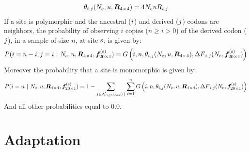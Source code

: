 \begin{equation}
\theta_{{i}, {j}}(N_{\textrm{e}}, u, \bm{R}_{4\times4}) = 4 N_{\textrm{e}} u R_{{i}, {j}}
\end{equation}
If a site is polymorphic and the ancestral (${i}$) and derived (${j}$) codons are neighbors, the probability of observing $i$ copies ($n \geq i > 0$) of the derived codon (${j}$), in a sample of size $n$, at site $\text{s}$, is given by:
\begin{equation}
P({i}=n-i,{j}=i \ |\ N_{\textrm{e}}, u, \bm{R}_{4\times4}, \bm{f}_{20\times1}^{(\text{s})}) = G\left(i, n, \theta_{{i}, {j}}(N_{\textrm{e}}, u, \bm{R}_{4\times4}), {\Delta F}_{{i}, {j}}(N_{\textrm{e}}, \bm{f}_{20\times1}^{(\text{s})}) \right)
\end{equation}
Moreover the probability that a site is monomorphic is given by:
\begin{equation}
P({i}= n \ |\ N_{\textrm{e}}, u, \bm{R}_{4\times4}, \bm{f}_{20\times1}^{(\text{s})}) = 1 - \sum_{{j} \in \mathcal{N}_{\mathrm{eighbors}}\left({i}\right)} \sum_{i=1}^{n} G\left(i, n, \theta_{{i}, {j}}(N_{\textrm{e}}, u, \bm{R}_{4\times4}), {\Delta F}_{{i}, {j}}(N_{\textrm{e}}, \bm{f}_{20\times1}^{(\text{s})})\right)
\end{equation}
And all other probabilities equal to $0.0$.

\section{Adaptation}

